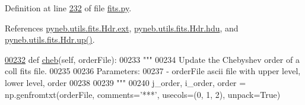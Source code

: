Definition at line \hyperlink{fits_8py_source_l00232}{232} of file \hyperlink{fits_8py_source}{fits.\+py}.



References \hyperlink{fits_8py_source_l00216}{pyneb.\+utils.\+fits.\+Hdr.\+ext}, \hyperlink{fits_8py_source_l00215}{pyneb.\+utils.\+fits.\+Hdr.\+hdu}, and \hyperlink{fits_8py_source_l00223}{pyneb.\+utils.\+fits.\+Hdr.\+up()}.


\begin{DoxyCode}
\hypertarget{classpyneb_1_1utils_1_1fits_1_1_hdr_l00232}{}\hyperlink{classpyneb_1_1utils_1_1fits_1_1_hdr_a8b3404b437c53986a68387da48a423f3}{00232}     \textcolor{keyword}{def }\hyperlink{classpyneb_1_1utils_1_1fits_1_1_hdr_a8b3404b437c53986a68387da48a423f3}{cheb}(self, orderFile):    
00233         \textcolor{stringliteral}{""" }
00234 \textcolor{stringliteral}{        Update the Chebyshev order of a coll fits file.}
00235 \textcolor{stringliteral}{        }
00236 \textcolor{stringliteral}{        Parameters:}
00237 \textcolor{stringliteral}{            - orderFile    ascii file with upper level, lower level, order}
00238 \textcolor{stringliteral}{        }
00239 \textcolor{stringliteral}{        """}    
00240         j\_order, i\_order, order = np.genfromtxt(orderFile, comments=\textcolor{stringliteral}{'***'}, usecols=(0, 1, 2), unpack=\textcolor{keyword}{True}) 
         

\end{DoxyCode}
